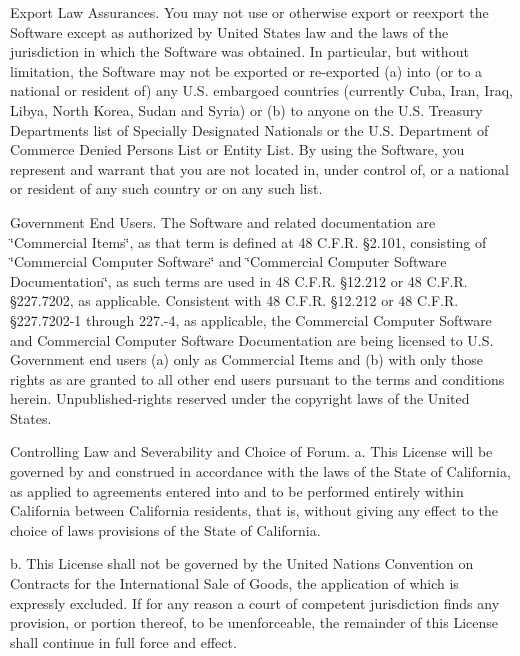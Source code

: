 \begin{DoxyEnumerate}
\item Export Law Assurances. You may not use or otherwise export or reexport the Software except as authorized by United States law and the laws of the jurisdiction in which the Software was obtained. In particular, but without limitation, the Software may not be exported or re-\/exported (a) into (or to a national or resident of) any U.\+S. embargoed countries (currently Cuba, Iran, Iraq, Libya, North Korea, Sudan and Syria) or (b) to anyone on the U.\+S. Treasury Department\textquotesingle{}s list of Specially Designated Nationals or the U.\+S. Department of Commerce Denied Person\textquotesingle{}s List or Entity List. By using the Software, you represent and warrant that you are not located in, under control of, or a national or resident of any such country or on any such list.
\item Government End Users. The Software and related documentation are \char`\"{}\+Commercial Items\char`\"{}, as that term is defined at 48 C.\+F.\+R. §2.101, consisting of \char`\"{}\+Commercial Computer Software\char`\"{} and \char`\"{}\+Commercial Computer Software Documentation\char`\"{}, as such terms are used in 48 C.\+F.\+R. §12.212 or 48 C.\+F.\+R. §227.7202, as applicable. Consistent with 48 C.\+F.\+R. §12.212 or 48 C.\+F.\+R. §227.7202-\/1 through 227.-\/4, as applicable, the Commercial Computer Software and Commercial Computer Software Documentation are being licensed to U.\+S. Government end users (a) only as Commercial Items and (b) with only those rights as are granted to all other end users pursuant to the terms and conditions herein. Unpublished-\/rights reserved under the copyright laws of the United States.
\item Controlling Law and Severability and Choice of Forum. a. This License will be governed by and construed in accordance with the laws of the State of California, as applied to agreements entered into and to be performed entirely within California between California residents, that is, without giving any effect to the choice of laws provisions of the State of California.
\end{DoxyEnumerate}

b. This License shall not be governed by the United Nations Convention on Contracts for the International Sale of Goods, the application of which is expressly excluded. If for any reason a court of competent jurisdiction finds any provision, or portion thereof, to be unenforceable, the remainder of this License shall continue in full force and effect.

